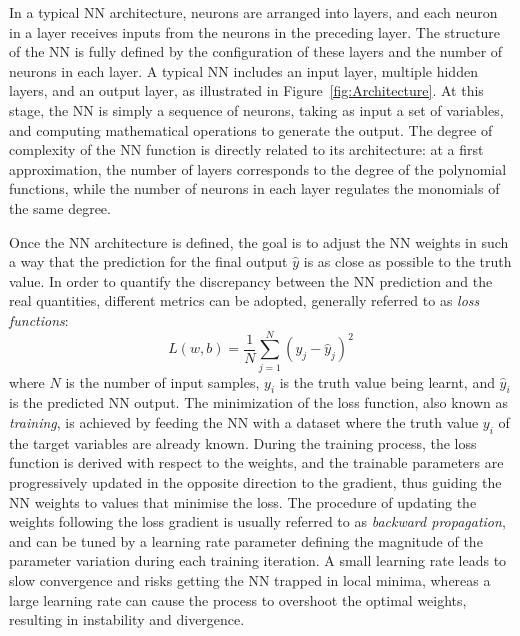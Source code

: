 In a typical NN architecture, neurons are arranged into layers, and each neuron in a layer receives inputs from the neurons in the preceding layer. 
The structure of the NN is fully defined by the configuration of these layers and the number of neurons in each layer. A typical NN includes an input layer, multiple hidden layers, and an output layer, as illustrated in Figure~\ref{fig:Architecture}.
At this stage, the NN is simply a sequence of neurons, taking as input a set of variables, and computing mathematical operations to generate the output. The degree of complexity of the NN function is directly related to its architecture: at a first approximation, the number of layers corresponds to the degree of the polynomial functions, while the number of neurons in each layer regulates the monomials of the same degree. 

Once the NN architecture is defined, the goal is to adjust the NN weights in such a way that the prediction for the final output $\hat{y}$ is as close as possible to the truth value. 
In order to quantify the discrepancy between the NN prediction and the real quantities, different metrics can be adopted, generally referred to as \textit{loss functions}:
\begin{equation}
    L(w,b)=\frac{1}{N}\sum_{j=1}^N(y_j-\hat{y}_j)^2
\end{equation}
where $N$ is the number of input samples, $y_i$ is the truth value being learnt, and $\hat{y}_i$ is the predicted NN output.
The minimization of the loss function, also known as \textit{training}, is achieved by feeding the NN with a dataset where the truth value $y_i$ of the target variables are already known.
During the training process, the loss function is derived with respect to the weights, and the trainable parameters are progressively updated in the opposite direction to the gradient, thus guiding the NN weights to values that minimise the loss. The procedure of updating the weights following the loss gradient is usually referred to as \textit{backward propagation}, and can be tuned by a learning rate parameter defining the magnitude of the parameter variation during each training iteration. A small learning rate leads to slow convergence and risks getting the NN trapped in local minima, whereas a large learning rate can cause the process to overshoot the optimal weights, resulting in instability and divergence.

